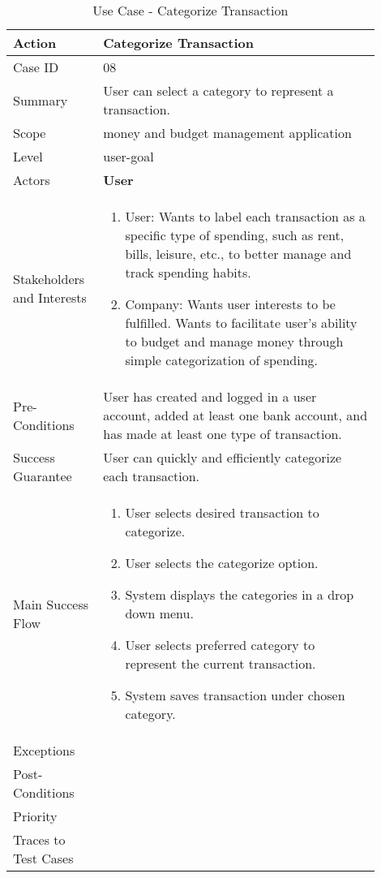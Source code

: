 \documentclass[11pt]{article}
\newcounter{use case ID}
\newcommand\tabularhead[1]{
\begin{table}[ht]
    \addtocounter{use case ID}{1}
    \caption{Use Case \arabic{use case ID} - #1}
    \vspace{0.2cm}
    \begin{tabular}{|p{0.2\linewidth}|p{0.70\linewidth}|}
    \hline
        \textbf{Action} & \textbf{#1} \\
        \hline}
\newcommand\addrow[2]{#1 & #2\\ \hline}
\newcommand\addmulrow[2]{ \begin{minipage}[t][][t]{2.5cm}#1\end{minipage}
        &\begin{minipage}[t][][t]{11cm}
        \begin{enumerate}[itemsep=-1ex] #2   \end{enumerate}
    \end{minipage}\vfill\\ \hline}
\newenvironment{usecase}{\tabularhead}
{\hline\end{tabular}\end{table}}
\begin{document}
\begin{usecase}{Categorize Transaction}
    \addrow{Case ID}{08}
    \addrow{Summary}{User can select a category to represent a transaction.}
    \addrow{Scope}{money and budget management application}
    \addrow{Level}{user-goal}
    \addrow{Actors}{\textbf{User}}
    \addmulrow{Stakeholders and Interests}{
        \item User: Wants to label each transaction as a specific type of spending, such as rent, bills, leisure, etc., to better manage and track spending habits.
        \item Company: Wants user interests to be fulfilled. Wants to facilitate user's ability to budget and manage money through simple categorization of spending.}
    \addrow{Pre-Conditions}{User has created and logged in a user account, added at least one bank account, and has made at least one type of transaction.}
    \addrow{Success Guarantee}{User can quickly and efficiently categorize each transaction.}
    \addmulrow{Main Success Flow}{
        \item User selects desired transaction to categorize.
        \item User selects the categorize option.
        \item System displays the categories in a drop down menu.
        \item User selects preferred category to represent the current transaction.
        \item System saves transaction under chosen category.}
        \addrow{Exceptions}{}
    \addrow{Post-Conditions}{}
    \addrow{Priority}{}
    \addrow{Traces to Test Cases}{}
\end{usecase}
\end{document}
